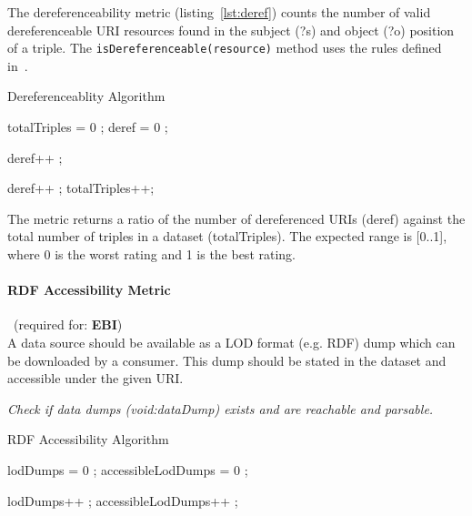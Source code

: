 The dereferenceability metric (listing~\ref{lst:deref}) counts the number of valid dereferenceable URI resources found in the subject (?s) and object (?o) position of a triple. The \texttt{isDereferenceable(resource)} method uses the rules defined in~\cite{Yang2011}.
\begin{algorithm}
\caption{Dereferenceablity Algorithm}\label{lst:deref}
\begin{algorithmic}[1]
\State totalTriples = 0 ;
\State deref = 0 ;
\EndProcedure

 deref++ ; \EndIf

 deref++ ; \EndIf
\State totalTriples++;
\EndProcedure
\end{algorithmic}
\end{algorithm}
The metric returns a ratio of the number of dereferenced URIs (deref) against the total number of triples in a dataset (totalTriples). The expected range is [0..1], where 0 is the worst rating and 1 is the best rating.

\paragraph{RDF Accessibility Metric}~(required for: \textbf{EBI})~\\
A data source should be available as a LOD format (e.g. RDF) dump which can be downloaded by a consumer.
This dump should be stated in the dataset and accessible under the given URI.

\begin{mdframed}[style=metricdefinition]
\emph{Check if data dumps (void:dataDump) exists and are reachable and parsable.}
\end{mdframed}

\begin{algorithm}
\caption{RDF Accessibility Algorithm}\label{lst:deref}
\begin{algorithmic}[1]
\State lodDumps = 0 ;
\State accessibleLodDumps = 0 ;
\EndProcedure

 lodDumps++ ; \EndIf
{} accessibleLodDumps++ ; \EndIf
\EndProcedure
\end{algorithmic}
\end{algorithm}

